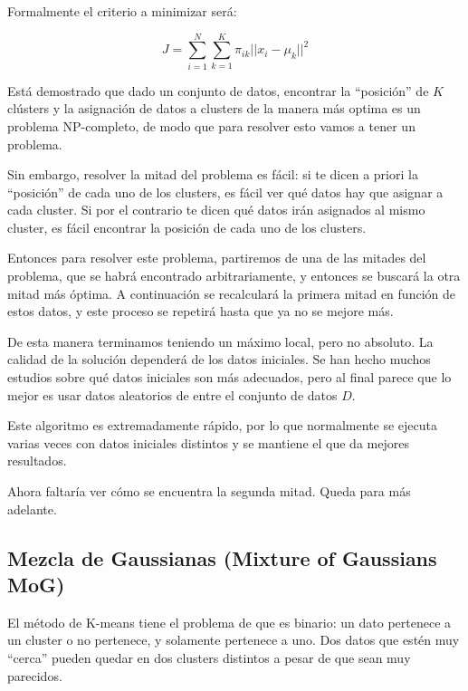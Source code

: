 \documentclass[a4paper,10pt]{article}
\begin{document}
Formalmente el criterio a minimizar será:

\begin{equation*}
J = \sum_{i = 1}^{N} \sum_{k = 1}^{K} \pi_{ik} ||x_i - \mu_k||^2
\end{equation*}

Está demostrado que dado un conjunto de datos, encontrar la ``posición'' de $K$ clústers y la asignación de datos a clusters de la manera más optima es un problema NP-completo, de modo que para resolver esto vamos a tener un problema.

Sin embargo, resolver la mitad del problema es fácil: si te dicen a priori la ``posición'' de cada uno de los clusters, es fácil ver qué datos hay que asignar a cada cluster. Si por el contrario te dicen qué datos irán asignados al mismo cluster, es fácil encontrar la posición de cada uno de los clusters.

Entonces para resolver este problema, partiremos de una de las mitades del problema, que se habrá encontrado arbitrariamente, y entonces se buscará la otra mitad más óptima. A continuación se recalculará la primera mitad en función de estos datos, y este proceso se repetirá hasta que ya no se mejore más.

De esta manera terminamos teniendo un máximo local, pero no absoluto. La calidad de la solución dependerá de los datos iniciales. Se han hecho muchos estudios sobre qué datos iniciales son más adecuados, pero al final parece que lo mejor es usar datos aleatorios de entre el conjunto de datos $D$.

Este algoritmo es extremadamente rápido, por lo que normalmente se ejecuta varias veces con datos iniciales distintos y se mantiene el que da mejores resultados.


Ahora faltaría ver cómo se encuentra la segunda mitad. Queda para más adelante.

\subsection{Mezcla de Gaussianas (Mixture of Gaussians MoG)}

El método de K-means tiene el problema de que es binario: un dato pertenece a un cluster o no pertenece, y solamente pertenece a uno. Dos datos que estén muy ``cerca'' pueden quedar en dos clusters distintos a pesar de que sean muy parecidos.
\end{document}
